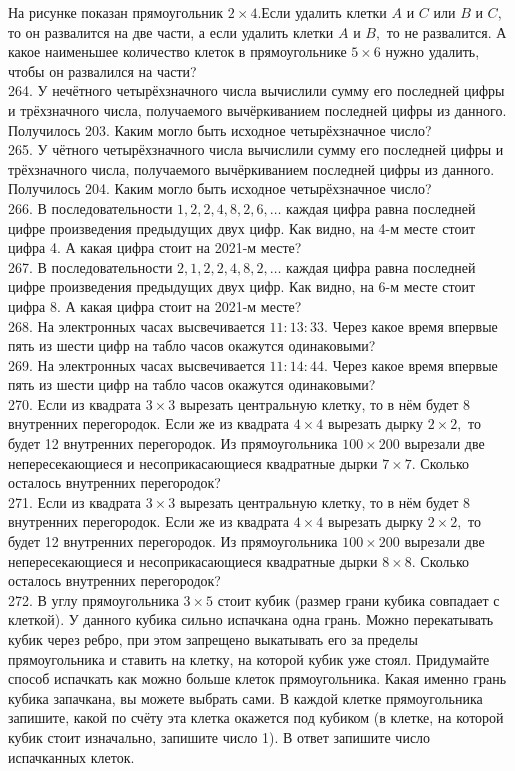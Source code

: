 На рисунке показан прямоугольник $2\times4.$Если удалить клетки $A$ и $C$ или $B$ и $C,$ то он развалится на две части, а если удалить клетки $A$ и $B,$ то не развалится. А какое наименьшее количество клеток в прямоугольнике $5\times6$ нужно удалить, чтобы он развалился на части?\\
264. У нечётного четырёхзначного числа вычислили сумму его последней цифры и трёхзначного числа, получаемого вычёркиванием последней цифры из данного. Получилось 203. Каким могло быть исходное четырёхзначное число?\\
265. У чётного четырёхзначного числа вычислили сумму его последней цифры и трёхзначного числа, получаемого вычёркиванием последней цифры из данного. Получилось 204. Каким могло быть исходное четырёхзначное число?\\
266. В последовательности $1, 2, 2, 4, 8, 2, 6, \ldots$ каждая цифра равна последней цифре произведения предыдущих двух цифр. Как видно, на 4-м месте стоит цифра 4. А какая цифра стоит на 2021-м месте?\\
267. В последовательности $2, 1, 2, 2, 4, 8, 2, \ldots$ каждая цифра равна последней цифре произведения предыдущих двух цифр. Как видно, на 6-м месте стоит цифра 8. А какая цифра стоит на 2021-м месте?\\
268. На электронных часах высвечивается $11:13:33.$ Через какое время впервые пять из шести цифр на табло часов окажутся одинаковыми?\\
269. На электронных часах высвечивается $11:14:44.$ Через какое время впервые пять из шести цифр на табло часов окажутся одинаковыми?\\
270. Если из квадрата $3\times3$ вырезать центральную клетку, то в нём будет 8 внутренних перегородок. Если же из квадрата $4\times4$ вырезать дырку $2\times2,$ то будет 12 внутренних перегородок. Из прямоугольника $100\times200$ вырезали две непересекающиеся и несоприкасающиеся квадратные дырки $7\times7.$ Сколько осталось внутренних перегородок?\\
271. Если из квадрата $3\times3$ вырезать центральную клетку, то в нём будет 8 внутренних перегородок. Если же из квадрата $4\times4$ вырезать дырку $2\times2,$ то будет 12 внутренних перегородок. Из прямоугольника $100\times200$ вырезали две непересекающиеся и несоприкасающиеся квадратные дырки $8\times8.$ Сколько осталось внутренних перегородок?\\
272. В углу прямоугольника $3\times5$ стоит кубик (размер грани кубика совпадает с клеткой). У данного кубика сильно испачкана одна грань. Можно перекатывать кубик через ребро, при этом запрещено выкатывать его за пределы прямоугольника и ставить на клетку, на которой кубик уже стоял. Придумайте способ испачкать как можно больше клеток прямоугольника. Какая именно грань кубика запачкана, вы можете выбрать сами. В каждой клетке прямоугольника запишите, какой по счёту эта клетка окажется под кубиком (в клетке, на которой кубик стоит изначально, запишите число 1). В ответ запишите число испачканных клеток.
